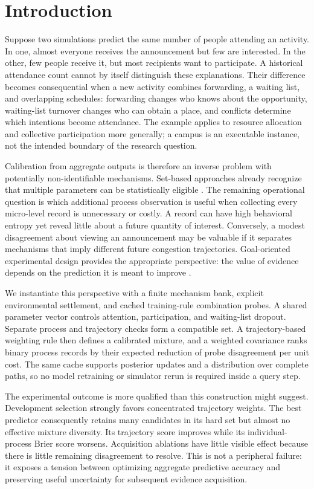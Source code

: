 \section{Introduction}
Suppose two simulations predict the same number of people attending an activity. In one, almost everyone receives the announcement but few are interested. In the other, few people receive it, but most recipients want to participate. A historical attendance count cannot by itself distinguish these explanations. Their difference becomes consequential when a new activity combines forwarding, a waiting list, and overlapping schedules: forwarding changes who knows about the opportunity, waiting-list turnover changes who can obtain a place, and conflicts determine which intentions become attendance. The example applies to resource allocation and collective participation more generally; a campus is an executable instance, not the intended boundary of the research question.

Calibration from aggregate outputs is therefore an inverse problem with potentially non-identifiable mechanisms. Set-based approaches already recognize that multiple parameters can be statistically eligible \citep{bai2022}. The remaining operational question is which additional process observation is useful when collecting every micro-level record is unnecessary or costly. A record can have high behavioral entropy yet reveal little about a future quantity of interest. Conversely, a modest disagreement about viewing an announcement may be valuable if it separates mechanisms that imply different future congestion trajectories. Goal-oriented experimental design provides the appropriate perspective: the value of evidence depends on the prediction it is meant to improve \citep{chaloner1995,attia2018,zhong2026}.

We instantiate this perspective with a finite mechanism bank, explicit environmental settlement, and cached training-rule combination probes. A shared parameter vector controls attention, participation, and waiting-list dropout. Separate process and trajectory checks form a compatible set. A trajectory-based weighting rule then defines a calibrated mixture, and a weighted covariance ranks binary process records by their expected reduction of probe disagreement per unit cost. The same cache supports posterior updates and a distribution over complete paths, so no model retraining or simulator rerun is required inside a query step.

The experimental outcome is more qualified than this construction might suggest. Development selection strongly favors concentrated trajectory weights. The best predictor consequently retains many candidates in its hard set but almost no effective mixture diversity. Its trajectory score improves while its individual-process Brier score worsens. Acquisition ablations have little visible effect because there is little remaining disagreement to resolve. This is not a peripheral failure: it exposes a tension between optimizing aggregate predictive accuracy and preserving useful uncertainty for subsequent evidence acquisition.

